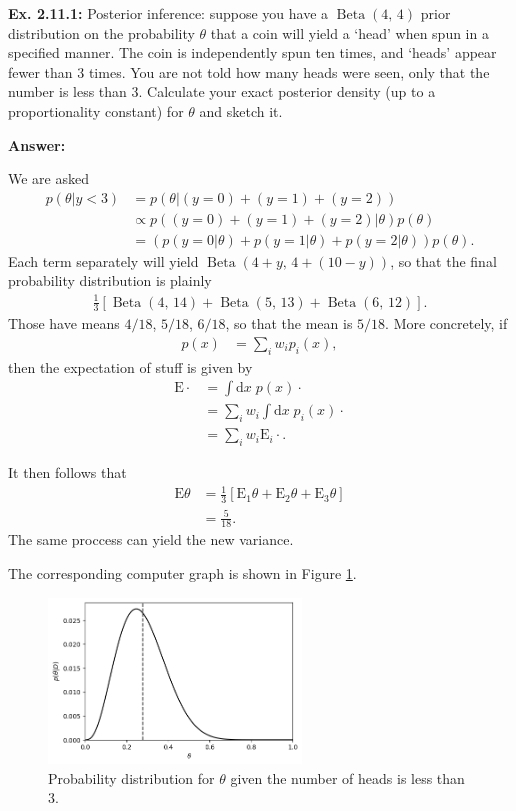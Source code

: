 \documentclass{article}
\newcommand\oname\operatorname
\begin{document}
\textbf{Ex. 2.11.1: }Posterior inference: suppose you have a $\oname{Beta}(4,\,4)$ prior distribution on the probability $\theta$ that a coin will yield a `head' when spun in a specified manner. The coin is independently spun ten times, and `heads' appear fewer than $3$ times. You are not told how many heads were seen, only that the number is less than $3$. Calculate your exact posterior density (up to a proportionality constant) for $\theta$ and sketch it.

\textbf{Answer:}

We are asked
\begin{align*}
	p(\theta|y<3)&=p(\theta|(y=0)+(y=1)+(y=2))\\
	&\propto p((y=0)+(y=1)+(y=2)|\theta)p(\theta)\\
	&=(p(y=0|\theta)+p(y=1|\theta)+p(y=2|\theta))p(\theta).
\end{align*}
Each term separately will yield $\oname{Beta}(4+y,\,4+(10-y))$, so that the final probability distribution is plainly
\begin{align*}
	\frac13\left[\oname{Beta}(4,\,14)+\oname{Beta}(5,\,13)+\oname{Beta}(6,\,12)\right].
\end{align*}
Those have means $4/18$, $5/18$, $6/18$, so that the mean is $5/18$. More concretely, if
\begin{align*}
	p(x)&=\sum_iw_ip_i(x),
\end{align*}
then the expectation of stuff is given by
\begin{align*}
	\mathrm E\cdot&=\int\mathrm dx\;p(x)\cdot\\
	&=\sum_iw_i\int\mathrm dx\;p_i(x)\cdot\\
	&=\sum_iw_i\mathrm E_i\cdot.
\end{align*}

It then follows that
\begin{align*}
	\mathrm E\theta&=\frac13\left[\mathrm E_1\theta+\mathrm E_2\theta+\mathrm E_3\theta\right]\\
	&=\frac5{18}.
\end{align*}
The same proccess can yield the new variance.

The corresponding computer graph is shown in Figure \ref{fig:2.11.1}.
\begin{figure}[h]
	\centering
	\includegraphics[width=0.6\textwidth]{Numerical/2.11.1}
	\caption{Probability distribution for $\theta$ given the number of heads is less than $3$.}
	\label{fig:2.11.1}
\end{figure}
\end{document}
